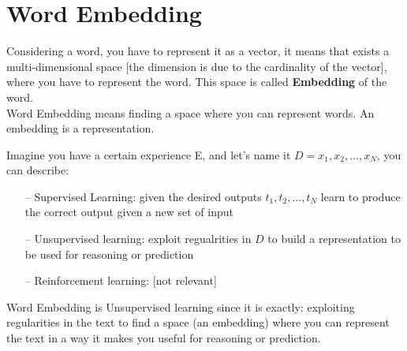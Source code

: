 \section{Word Embedding}
Considering a word, you have to represent it as a vector, it means that exists a multi-dimensional space [the dimension is due to the cardinality  of the vector], 
where you have to represent the word. This space is called \textbf{Embedding} of the word. \\
Word Embedding means finding a space where you can represent words. An embedding is a representation.

Imagine you have a certain experience E, and let's name it $D = x_1, x_2, ..., x_N$, you can describe:
\begin{itemize}
    \item[--] Supervised Learning: given the desired outputs $t_1,t_2,...,t_N$ learn to produce the correct output given a new set of input
    \item[--] Unsupervised learning: exploit regualrities in $D$ to build a representation to be used for reasoning or prediction
    \item[--] Reinforcement learning: [not relevant]
\end{itemize}{}

Word Embedding is Unsupervised learning since it is exactly: exploiting regularities in the text to find a space (an embedding) where you can represent the text in a way it makes you useful for reasoning or prediction.  \\

 

